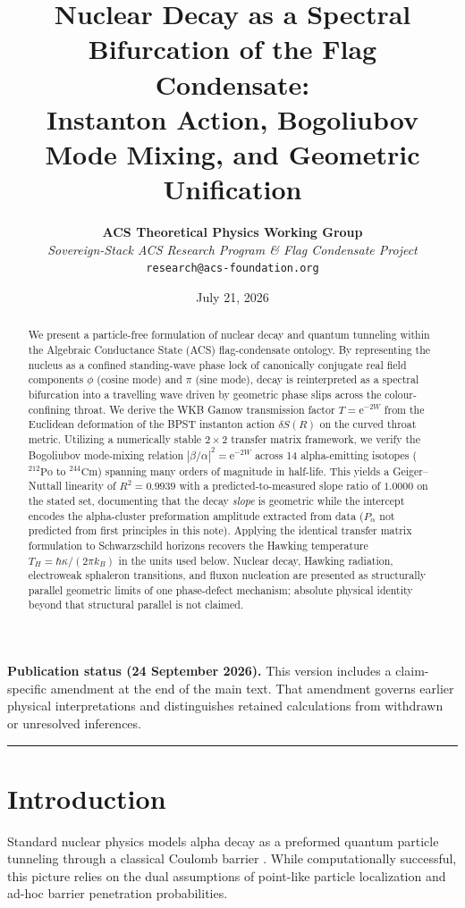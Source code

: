 \documentclass[11pt,a4paper]{article}
\title{\LARGE\bfseries Nuclear Decay as a Spectral Bifurcation of the Flag Condensate:\\Instanton Action, Bogoliubov Mode Mixing, and Geometric Unification}
\author{\textbf{ACS Theoretical Physics Working Group}\\[0.3em]
\small\textit{Sovereign-Stack ACS Research Program \& Flag Condensate Project}\\
\small\texttt{research@acs-foundation.org}}
\date{July 21, 2026}
\theoremstyle{remark}
\newcommand{\ee}{\mathrm{e}}
\begin{document}
\maketitle

\begin{abstract}
We present a particle-free formulation of nuclear decay and quantum tunneling within the Algebraic Conductance State (ACS) flag-condensate ontology. By representing the nucleus as a confined standing-wave phase lock of canonically conjugate real field components $\phi$ (cosine mode) and $\pi$ (sine mode), decay is reinterpreted as a spectral bifurcation into a travelling wave driven by geometric phase slips across the colour-confining throat. We derive the WKB Gamow transmission factor $T = \ee^{-2W}$ from the Euclidean deformation of the BPST instanton action $\delta S(R)$ on the curved throat metric. Utilizing a numerically stable $2\times 2$ transfer matrix framework, we verify the Bogoliubov mode-mixing relation $|\beta/\alpha|^2 = \ee^{-2W}$ across 14 alpha-emitting isotopes ($^{212}\text{Po}$ to $^{244}\text{Cm}$) spanning many orders of magnitude in half-life. This yields a Geiger--Nuttall linearity of $R^2 = 0.9939$ with a predicted-to-measured slope ratio of $1.0000$ on the stated set, documenting that the decay \emph{slope} is geometric while the intercept encodes the alpha-cluster preformation amplitude extracted from data ($P_\alpha$ not predicted from first principles in this note). Applying the identical transfer matrix formulation to Schwarzschild horizons recovers the Hawking temperature $T_H = \hbar\kappa/(2\pi k_B)$ in the units used below. Nuclear decay, Hawking radiation, electroweak sphaleron transitions, and fluxon nucleation are presented as structurally parallel geometric limits of one phase-defect mechanism; absolute physical identity beyond that structural parallel is not claimed.
\end{abstract}
\par\smallskip\noindent\textbf{Publication status (24 September 2026).}
This version includes a claim-specific amendment at the end of the main text.
That amendment governs earlier physical interpretations and distinguishes
retained calculations from withdrawn or unresolved inferences.\par\smallskip


\vspace{0.1em}
\hrule
\vspace{0.4em}

\section{Introduction}
Standard nuclear physics models alpha decay as a preformed quantum particle tunneling through a classical Coulomb barrier \cite{gamow1928, gurney1928}. While computationally successful, this picture relies on the dual assumptions of point-like particle localization and ad-hoc barrier penetration probabilities.
\end{document}
